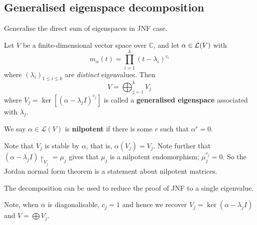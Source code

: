 \documentclass[a4paper]{article}
\begin{document}
\subsection{Generalised eigenspace decomposition}
Generalise the direct sum of eigenspaces in JNF case. 
\begin{theorem}
	Let $ V $ be a finite-dimensional vector space over $\mathbb{C}$, and let $ \alpha\in {\mathcal{L}}(V) $ with
	\[
		m_\alpha(t) = \prod_{i=1}^k (t - \lambda_i)^{c_i}
	\]
	where $ (\lambda_i)_{1\le i\le k} $ are \textit{distinct} eigenvalues. Then 
	\[
		V = \bigoplus_{j=1}^k V_j
	\]
	where \( V_j = \ker[(\alpha - \lambda_j I)^{c_j}] \) is called a \textbf{generalised eigenspace} associated with \( \lambda_j \).	
\end{theorem}
\begin{definition}
	We say $\alpha \in \mathcal{L}(V)$ is \textbf{nilpotent} if there is some $r$ such that $\alpha^r = 0$.
  \end{definition}

  \begin{remark}
	Note that \( V_j \) is stable by \( \alpha \), that is, \( \alpha(V_j) = V_j \).
	Note further that \( {(\alpha - \lambda_j I)}\restriction_{V_j} = \mu_j \) gives that \( \mu_j \) is a nilpotent endomorphism; \( \mu_j^{c_j} = 0 \).
	So the Jordan normal form theorem is a statement about nilpotent matrices.

	The decomposition can be used to reduce the proof of JNF to a single eigenvalue. 

	Note, when \( \alpha \) is diagonalisable, \( c_j = 1 \) and hence we recover \( V_j = \ker(\alpha - \lambda_j I) \) and \( V = \bigoplus V_j \).
\end{remark}
\end{document}
